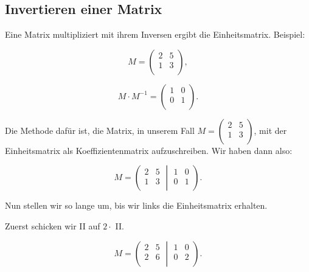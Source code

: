 \documentclass{scrartcl}
\begin{document}
\subsection{Invertieren einer Matrix}

\label{invertieren}

Eine Matrix multipliziert mit ihrem Inversen ergibt die Einheitsmatrix. Beispiel:

\begin{equation}
	M = \begin{pmatrix*}
		2 & 5 \\
		1 & 3 \\
	\end{pmatrix*},
\end{equation}

\begin{equation}
	M \cdot M^{-1} = \begin{pmatrix*}
		1 & 0 \\
		0 & 1 \\
	\end{pmatrix*}.
\end{equation}

Die Methode dafür ist, die Matrix, in unserem Fall $M = \begin{pmatrix*}
	2 & 5 \\
	1 & 3 \\
\end{pmatrix*}$, mit der Einheitsmatrix als Koeffizientenmatrix aufzuschreiben. Wir haben dann also:

\begin{equation}
	M = \left(\begin{matrix}
		2 & 5 \\
		1 & 3 \\
	\end{matrix}
	\middle\vert
	\begin{matrix}
		1 & 0 \\
		0 & 1\\
	\end{matrix}\right).
\end{equation}

Nun stellen wir so lange um, bis wir links die Einheitsmatrix erhalten.

Zuerst schicken wir II auf $2\cdot$ II.

\begin{equation}
	M = \left(\begin{matrix}
		2 & 5 \\
		2 & 6 \\
	\end{matrix}
	\middle\vert
	\begin{matrix}
		1 & 0 \\
		0 & 2\\
	\end{matrix}\right).
\end{equation}
\end{document}
